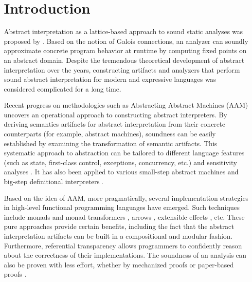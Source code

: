 \section{Introduction} \label{intro}

Abstract interpretation as a lattice-based approach to sound static analyses was
proposed by \citet{DBLP:conf/popl/CousotC77, CousotCousot79-1}. Based on the
notion of Galois connections, an analyzer can soundly approximate concrete
program behavior at runtime by computing fixed points on an abstract domain.
Despite the tremendous theoretical development of abstract interpretation over
the years, constructing artifacts and analyzers that perform sound abstract
interpretation for modern and expressive languages was considered complicated
for a long time.

Recent progress on methodologies such as Abstracting Abstract Machines (AAM)
\cite{DBLP:journals/jfp/HornM12, DBLP:conf/icfp/HornM10} uncovers an operational
approach to constructing abstract interpreters.  By deriving semantics artifacts
for abstract interpretation from their concrete counterparts (for example,
abstract machines), soundness can be easily established by examining the
transformation of semantic artifacts. This systematic approach to abstraction
can be tailored to different language features (such as state, first-class
control, exceptions, concurrency, etc.) and sensitivity analyses
\cite{DBLP:conf/icfp/Gilray0M16, DBLP:conf/popl/GilrayL0MH16,
Darais:2015:GTM:2814270.2814308}. It has also been applied to various small-step
abstract machines \cite{DBLP:journals/jfp/HornM12, DBLP:conf/icfp/HornM10,
Sergey:2013:MAI:2491956.2491979} and big-step definitional interpreters
\cite{Wei:2018:RAA:3243631.3236800, DBLP:journals/pacmpl/DaraisLNH17,
Keidel:2018:CSP:3243631.3236767}.


Based on the idea of AAM, more pragmatically, several implementation strategies
in high-level functional programming languages have emerged.  Such techniques
include monads and monad transformers \cite{DBLP:journals/pacmpl/DaraisLNH17,
Sergey:2013:MAI:2491956.2491979}, arrows \cite{Keidel:2018:CSP:3243631.3236767},
extensible effects \cite{Kiselyov:2015:FMM:2804302.2804319, Githubsemantic},
etc. These pure approaches provide certain benefits, including the fact that the
abstract interpretation artifacts can be built in a compositional and modular
fashion. Furthermore, referential transparency allows programmers to confidently
reason about the correctness of their implementations.  The soundness of an
analysis can also be proven with less effort, whether by mechanized proofs
\cite{Darais:2016:CGC:2951913.2951934} or paper-based proofs
\cite{Keidel:2018:CSP:3243631.3236767}.

